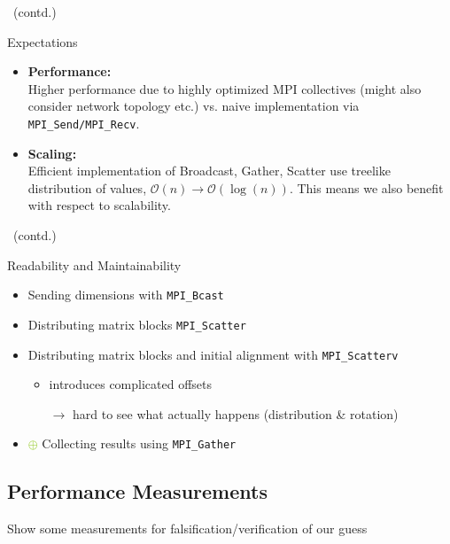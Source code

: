 \documentclass[9pt,pdftex,xcolor=dvipsnames]{beamer}
\begin{document}
\begin{frame}{\insertsubsection \ (contd.)}
\begin{block}{Expectations}
\begin{itemize}
\item \textbf{Performance:\\}
Higher performance due to highly optimized MPI collectives (might also consider network topology etc.) vs. naive implementation via \lstinline[basicstyle=\ttfamily]{MPI_Send/MPI_Recv}.
\item \textbf{Scaling:\\}
Efficient implementation of Broadcast, Gather, Scatter use treelike distribution of values, $\mathcal{O}\left(n\right) \rightarrow \mathcal{O}\left(\log(n)\right)$. This means we also benefit with respect to scalability.
\end{itemize}
\end{block}
\end{frame}


\begin{frame}{\insertsubsection \ (contd.)}
\begin{block}{Readability and Maintainability}
\begin{itemize}
\item[\textcolor{YellowGreen}{$\bm\oplus$}] Sending dimensions with \lstinline[basicstyle=\ttfamily]{MPI_Bcast}
\item[\textcolor{YellowGreen}{$\bm\oplus$}] Distributing matrix blocks \lstinline[basicstyle=\ttfamily]{MPI_Scatter}
\item[\textcolor{red}{$\bm\ominus$}]
Distributing matrix blocks and initial alignment with \lstinline[basicstyle=\ttfamily]{MPI_Scatterv} 
	\begin{itemize}
	\item[$\rightarrow$] introduces complicated offsets 
	\item[$\rightarrow$] hard to see what actually happens (distribution \& rotation)
	\end{itemize} 
\item[\textcolor{YellowGreen}{$\bm{\oplus}$}] Collecting results using \lstinline[basicstyle=\ttfamily]{MPI_Gather}
\end{itemize}
\end{block}
\end{frame}



\subsection{Performance Measurements}
\begin{frame}{\insertsubsection}
Show some measurements for falsification/verification of our guess
\end{frame}
\end{document}
